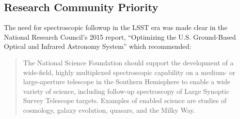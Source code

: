 \documentclass[oneside,11pt]{amsart}
\newcommand{\comment}[2][todo]{{\color{#1}[[{\bf #2}]]}}
\begin{document}






\subsection{Research Community Priority} 
\label{sec:community}



The need for spectroscopic followup in the LSST era was made clear in
the National Research Council's 2015 report, ``Optimizing the U.S.
Ground-Based Optical and Infrared Astronomy System'' \citep{NAP21722}
which recommended:

\begingroup
%
\addtolength\leftmargini{-0.1in}
%
\begin{quote}
%
The National Science Foundation should support the development of a
wide-field, highly multiplexed spectroscopic capability on a medium- or
large-aperture telescope in the Southern Hemisphere to enable a wide
variety of science, including follow-up spectroscopy of Large Synoptic
Survey Telescope targets. Examples of enabled science are studies of
cosmology, galaxy evolution, quasars, and the Milky Way.
%
\end{quote}
%
\endgroup
\end{document}
